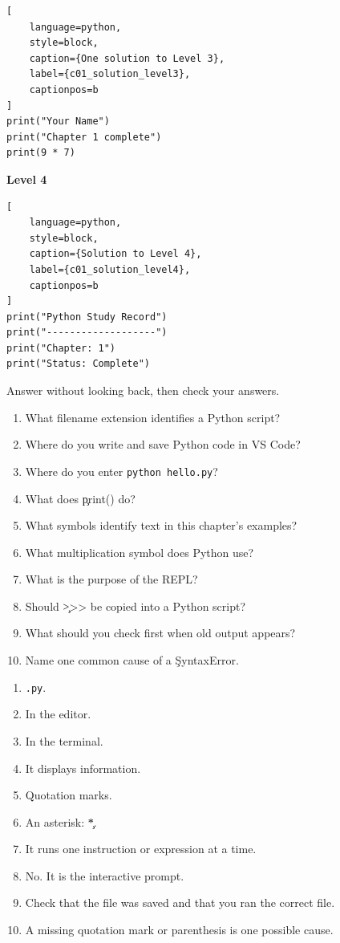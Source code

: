 \begin{lstlisting}[
    language=python,
    style=block,
    caption={One solution to Level 3},
    label={c01_solution_level3},
    captionpos=b
]
print("Your Name")
print("Chapter 1 complete")
print(9 * 7)
\end{lstlisting}

\textbf{Level 4}

\begin{lstlisting}[
    language=python,
    style=block,
    caption={Solution to Level 4},
    label={c01_solution_level4},
    captionpos=b
]
print("Python Study Record")
print("-------------------")
print("Chapter: 1")
print("Status: Complete")
\end{lstlisting}


Answer without looking back, then check your answers.

\begin{enumerate}
    \item What filename extension identifies a Python script?
    \item Where do you write and save Python code in VS Code?
    \item Where do you enter \texttt{python hello.py}?
    \item What does \c{print()} do?
    \item What symbols identify text in this chapter's examples?
    \item What multiplication symbol does Python use?
    \item What is the purpose of the REPL?
    \item Should \c{>>>} be copied into a Python script?
    \item What should you check first when old output appears?
    \item Name one common cause of a \c{SyntaxError}.
\end{enumerate}


\begin{enumerate}
    \item \texttt{.py}.
    \item In the editor.
    \item In the terminal.
    \item It displays information.
    \item Quotation marks.
    \item An asterisk: \c{*}.
    \item It runs one instruction or expression at a time.
    \item No. It is the interactive prompt.
    \item Check that the file was saved and that you ran the correct file.
    \item A missing quotation mark or parenthesis is one possible cause.
\end{enumerate}

